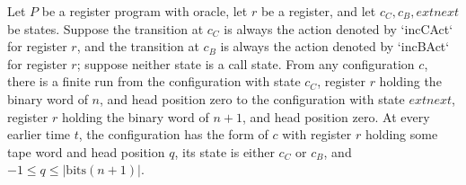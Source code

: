 \begin{lemma}
\label{Complexity.LogProg.inc_run}
\leanok
{}
Let $P$ be a register program with oracle, let $r$ be a register, and let
$c_C,c_B,	ext{next}$ be states. Suppose the transition at $c_C$ is always the action
denoted by `incCAct` for register $r$, and the transition at $c_B$ is always the action
denoted by `incBAct` for register $r$; suppose neither state is a call state. From any
configuration $c$, there is a finite run from the configuration with state $c_C$,
register $r$ holding the binary word of $n$, and head position zero to the configuration
with state $	ext{next}$, register $r$ holding the binary word of $n+1$, and head
position zero. At every earlier time $t$, the configuration has the form of $c$ with
register $r$ holding some tape word and head position $q$, its state is either $c_C$ or
$c_B$, and $-1\le q\le |\mathrm{bits}(n+1)|$.
\end{lemma}
